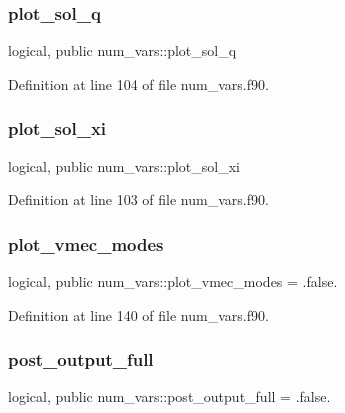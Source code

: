\subsubsection{\texorpdfstring{plot\+\_\+sol\+\_\+q}{plot\_sol\_q}}
{\footnotesize\ttfamily logical, public num\+\_\+vars\+::plot\+\_\+sol\+\_\+q}



Definition at line 104 of file num\+\_\+vars.\+f90.

\mbox{\label{namespacenum__vars_aca13a9c68dbf136ed2a2a8e0fa04c087}} 
\subsubsection{\texorpdfstring{plot\+\_\+sol\+\_\+xi}{plot\_sol\_xi}}
{\footnotesize\ttfamily logical, public num\+\_\+vars\+::plot\+\_\+sol\+\_\+xi}



Definition at line 103 of file num\+\_\+vars.\+f90.

\mbox{\label{namespacenum__vars_a89067eb4dc3fcdcc85d7cf185d3774ea}} 
\subsubsection{\texorpdfstring{plot\+\_\+vmec\+\_\+modes}{plot\_vmec\_modes}}
{\footnotesize\ttfamily logical, public num\+\_\+vars\+::plot\+\_\+vmec\+\_\+modes = .false.}



Definition at line 140 of file num\+\_\+vars.\+f90.

\mbox{\label{namespacenum__vars_a7d65e7e9a9c8d9882929fc014b81a81b}} 
\subsubsection{\texorpdfstring{post\+\_\+output\+\_\+full}{post\_output\_full}}
{\footnotesize\ttfamily logical, public num\+\_\+vars\+::post\+\_\+output\+\_\+full = .false.}



